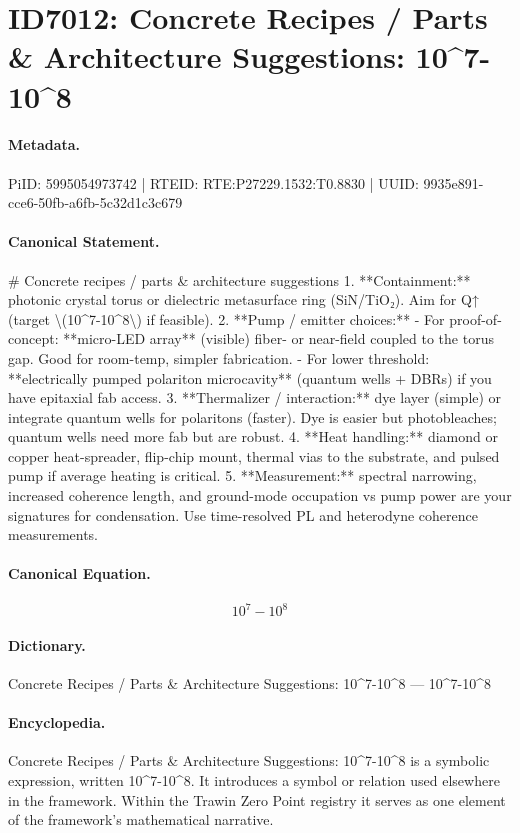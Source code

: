 \section*{ID7012: Concrete Recipes / Parts \& Architecture Suggestions: 10\textasciicircum{}7-10\textasciicircum{}8}
\paragraph{Metadata.}
PiID: 5995054973742 | RTEID: RTE:P27229.1532:T0.8830 | UUID: 9935e891-cce6-50fb-a6fb-5c32d1c3c679

\paragraph{Canonical Statement.}
\# Concrete recipes / parts \& architecture suggestions 1. **Containment:** photonic crystal torus or dielectric metasurface ring (SiN/TiO₂). Aim for Q↑ (target \textbackslash{}(10\textasciicircum{}7-10\textasciicircum{}8\textbackslash{}) if feasible). 2. **Pump / emitter choices:** - For proof-of-concept: **micro-LED array** (visible) fiber- or near-field coupled to the torus gap. Good for room-temp, simpler fabrication. - For lower threshold: **electrically pumped polariton microcavity** (quantum wells + DBRs) if you have epitaxial fab access. 3. **Thermalizer / interaction:** dye layer (simple) or integrate quantum wells for polaritons (faster). Dye is easier but photobleaches; quantum wells need more fab but are robust. 4. **Heat handling:** diamond or copper heat-spreader, flip-chip mount, thermal vias to the substrate, and pulsed pump if average heating is critical. 5. **Measurement:** spectral narrowing, increased coherence length, and ground-mode occupation vs pump power are your signatures for condensation. Use time-resolved PL and heterodyne coherence measurements.

\paragraph{Canonical Equation.}
\[
10^7-10^8
\]

\paragraph{Dictionary.}
Concrete Recipes / Parts \& Architecture Suggestions: 10\textasciicircum{}7-10\textasciicircum{}8 — 10\textasciicircum{}7-10\textasciicircum{}8

\paragraph{Encyclopedia.}
Concrete Recipes / Parts \& Architecture Suggestions: 10\textasciicircum{}7-10\textasciicircum{}8 is a symbolic expression, written 10\textasciicircum{}7-10\textasciicircum{}8. It introduces a symbol or relation used elsewhere in the framework. Within the Trawin Zero Point registry it serves as one element of the framework's mathematical narrative.
